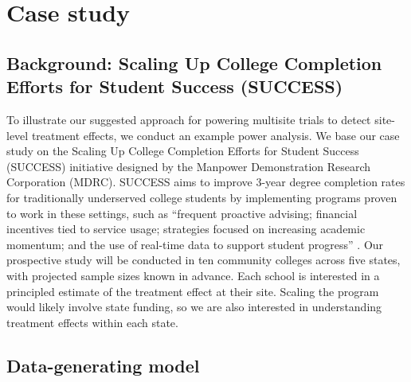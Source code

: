 \documentclass[]{article}
\begin{document}

\section{Case study}

\subsection{Background: Scaling Up College Completion Efforts for Student Success (SUCCESS)}

To illustrate our suggested approach for powering multisite trials to detect site-level treatment effects, we conduct an example power analysis.
We base our case study on the Scaling Up College Completion Efforts for Student Success (SUCCESS) initiative designed by the Manpower Demonstration Research Corporation (MDRC).
SUCCESS aims to improve 3-year degree completion rates for traditionally underserved college students by implementing programs proven to work in these settings, such as ``frequent proactive advising; financial incentives tied to service usage; strategies focused on increasing academic momentum; and the use of real-time data to support student progress'' \citep{MDRCsuccess}.
Our prospective study will be conducted in ten community colleges across five states, with projected sample sizes known in advance.
Each school is interested in a principled estimate of the treatment effect at their site.
Scaling the program would likely involve state funding, so we are also interested in understanding treatment effects within each state.

\subsection{Data-generating model}
\end{document}
